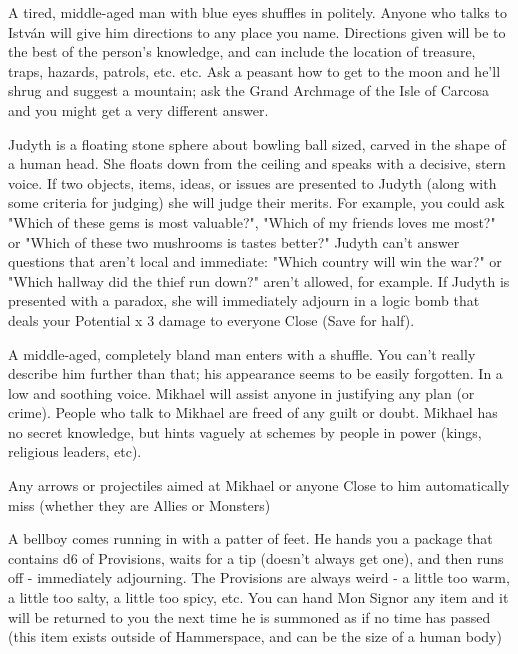 {

A tired, middle-aged man with blue eyes shuffles in politely.  Anyone who talks to István will give him directions to any place you name.  Directions given will be to the best of the person's knowledge, and can include the location of treasure, traps, hazards, patrols, etc. etc.  Ask a peasant how to get to the moon and he'll shrug and suggest a mountain; ask the Grand Archmage of the Isle of Carcosa and you might get a very different answer.  



Judyth is a floating stone sphere about bowling ball sized, carved in the shape of a human head.  She floats down from the ceiling and speaks with a decisive, stern voice.  If two objects, items, ideas, or issues are presented to Judyth (along with some criteria for judging) she will judge their merits. For example, you could ask "Which of these gems is most valuable?", "Which of my friends loves me most?" or "Which of these two mushrooms is tastes better?" Judyth can't answer questions that aren't local and immediate:  "Which country will win the war?" or "Which hallway did the thief run down?" aren't allowed, for example.  If Judyth is presented with a paradox, she will immediately adjourn in a logic bomb that deals your Potential x 3 damage to everyone Close (Save for half).


A middle-aged, completely bland man enters with a shuffle.  You can't really describe him further than that; his appearance seems to be easily forgotten.  In a low and soothing voice. Mikhael will assist anyone in justifying any plan (or crime).  People who talk to Mikhael are freed of any guilt or doubt.  Mikhael has no secret knowledge, but hints vaguely at schemes by people in power (kings, religious leaders, etc).  

Any arrows or projectiles aimed at Mikhael or anyone Close to him automatically miss (whether they are Allies or Monsters)



A bellboy comes running in with a patter of feet.  He hands you a package that contains d6 \UD of Provisions, waits for a tip (doesn't always get one), and then runs off - immediately adjourning.  The Provisions are always weird - a little too warm, a little too salty, a little too spicy, etc.  You can hand Mon Signor any item and it will be returned to you the next time he is summoned as if no time has passed (this item exists outside of Hammerspace, and can be the size of a human body)

}
